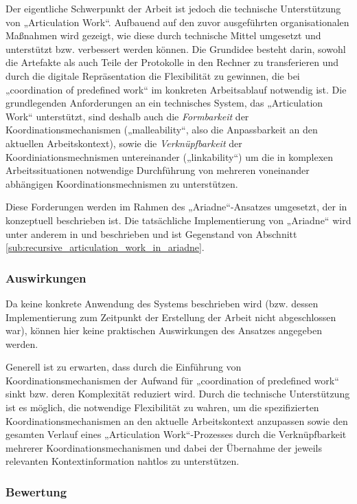 Der eigentliche Schwerpunkt der Arbeit ist jedoch die technische Unterstützung von „Articulation Work“. Aufbauend auf den zuvor ausgeführten organisationalen Maßnahmen wird gezeigt, wie diese durch technische Mittel umgesetzt und unterstützt bzw. verbessert werden können. Die Grundidee besteht darin, sowohl die Artefakte als auch Teile der Protokolle in den Rechner zu transferieren und durch die digitale Repräsentation die Flexibilität zu gewinnen, die bei „coordination of predefined work“ im konkreten Arbeitsablauf notwendig ist. Die grundlegenden Anforderungen an ein technisches System, das „Articulation Work“ unterstützt, sind deshalb auch die \emph{Formbarkeit} der Koordinationsmechanismen („malleability“, also die Anpassbarkeit an den aktuellen Arbeitskontext), sowie die \emph{Verknüpfbarkeit} der Koordiniationsmechnismen untereinander („linkability“) um die in komplexen Arbeitssituationen notwendige Durchführung von mehreren voneinander abhängigen Koordinationsmechnismen zu unterstützen.

Diese Forderungen werden im Rahmen des „Ariadne“-Ansatzes umgesetzt, der in \citep{Schmidt96} konzeptuell beschrieben ist. Die tatsächliche Implementierung von „Ariadne“ wird unter anderem in \citep{Divitini00} und \citep{Sarini03} beschrieben und ist Gegenstand von Abschnitt \ref{sub:recursive_articulation_work_in_ariadne}.

\subsubsection{Auswirkungen}

Da keine konkrete Anwendung des Systems beschrieben wird (bzw. dessen Implementierung zum Zeitpunkt der Erstellung der Arbeit nicht abgeschlossen war), können hier keine praktischen Auswirkungen des Ansatzes angegeben werden.

Generell ist zu erwarten, dass durch die Einführung von Koordinationsmechanismen der Aufwand für „coordination of predefined work“ sinkt bzw. deren Komplexität reduziert wird. Durch die technische Unterstützung ist es möglich, die notwendige Flexibilität zu wahren, um die spezifizierten Koordinationsmechanismen an den aktuelle Arbeitskontext anzupassen sowie den gesamten Verlauf eines „Articulation Work“-Prozesses durch die Verknüpfbarkeit mehrerer Koordinationsmechanismen und dabei der Übernahme der jeweils relevanten Kontextinformation nahtlos zu unterstützen.

\subsubsection{Bewertung}

